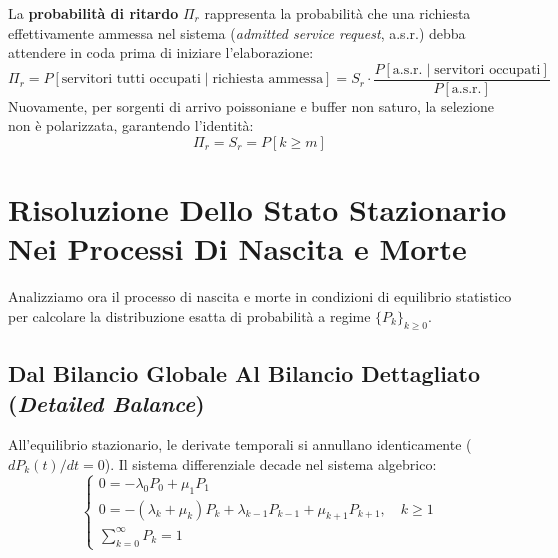 \documentclass[11pt, a4paper]{article}
\begin{document}
La \textbf{probabilità di ritardo} $\Pi_r$ rappresenta la probabilità che una richiesta effettivamente ammessa nel sistema (\emph{admitted service request}, a.s.r.) debba attendere in coda prima di iniziare l'elaborazione:
\[
    \Pi_r = P[\text{servitori tutti occupati} \mid \text{richiesta ammessa}] = S_r \cdot \frac{P[\text{a.s.r.} \mid \text{servitori occupati}]}{P[\text{a.s.r.}]}
\]
Nuovamente, per sorgenti di arrivo poissoniane e buffer non saturo, la selezione non è polarizzata, garantendo l'identità:
\[
    \boxed{\Pi_r = S_r = P[k \ge m]}
\]

\newpage


\section{Risoluzione Dello Stato Stazionario Nei Processi Di Nascita e Morte}

Analizziamo ora il processo di nascita e morte in condizioni di equilibrio statistico per calcolare la distribuzione esatta di probabilità a regime $\{P_k\}_{k \ge 0}$.

\subsection{Dal Bilancio Globale Al Bilancio Dettagliato (\emph{Detailed Balance})}

All'equilibrio stazionario, le derivate temporali si annullano identicamente ($dP_k(t)/dt = 0$). Il sistema differenziale decade nel sistema algebrico:
\begin{equation}
    \begin{cases}
        0 = -\lambda_0 P_0 + \mu_1 P_1 \\[6pt]
        0 = -(\lambda_k + \mu_k)P_k + \lambda_{k-1}P_{k-1} + \mu_{k+1}P_{k+1}, \quad k \ge 1 \\[6pt]
        \displaystyle \sum_{k=0}^{\infty} P_k = 1
    \end{cases} \label{eq:bd_equilibrium}
\end{equation}

\end{document}
